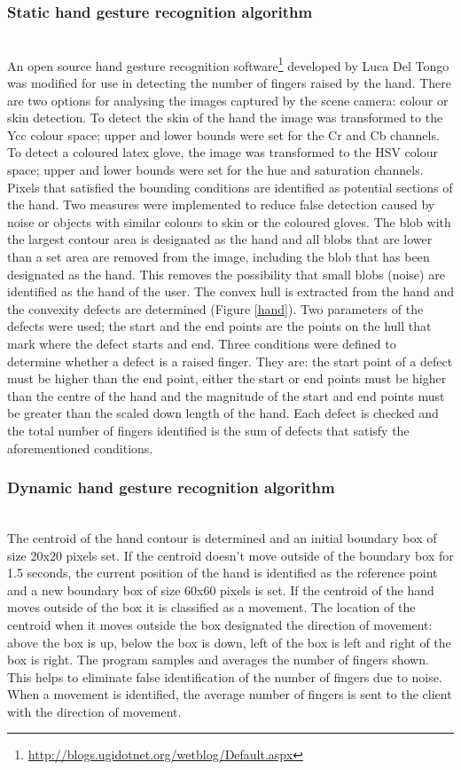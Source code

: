 \documentclass[jou,a4paper,notxfonts]{apa}
\begin{document}
\subsubsection{Static hand gesture recognition algorithm}\hspace{0pt} \\
An open source hand gesture recognition software\footnote{\url{http://blogs.ugidotnet.org/wetblog/Default.aspx}} developed by Luca Del Tongo was modified for use in detecting the number of fingers raised by the hand. There are two options for analysing the images captured by the scene camera: colour or skin detection. To detect the skin of the hand the image was transformed to the Ycc colour space; upper and lower bounds were set for the Cr and Cb channels. To detect a coloured latex glove, the image was transformed to the HSV colour space; upper and lower bounds were set for the hue and saturation channels. Pixels that satisfied the bounding conditions are identified as potential sections of the hand. Two measures were implemented to reduce false detection caused by noise or objects with similar colours to skin or the coloured gloves. The blob with the largest contour area is designated as the hand and all blobs that are lower than a set area are removed from the image, including the blob that has been designated as the hand. This removes the possibility that small blobs (noise) are identified as the hand of the user. The convex hull is extracted from the hand and the convexity defects are determined (Figure \ref{hand}). Two parameters of the defects were used; the start and the end points are the points on the hull that mark where the defect starts and end. Three conditions were defined to determine whether a defect is a raised finger. They are: the start point of a defect must be higher than the end point, either the start or end points must be higher than the centre of the hand and the magnitude of the start and end points must be greater than the scaled down length of the hand. Each defect is checked and the total number of fingers identified is the sum of defects that satisfy the aforementioned conditions. 

\subsubsection{Dynamic hand gesture recognition algorithm}\hspace{0pt} \\
The centroid of the hand contour is determined and an initial boundary box of size 20x20 pixels set. If the centroid doesn't move outside of the boundary box for 1.5 seconds, the current position of the hand is identified as the reference point and a new boundary box of size 60x60 pixels is set. If the centroid of the hand moves outside of the box it is classified as a movement. The location of the centroid when it moves outside the box designated the direction of movement: above the box is up, below the box is down, left of the box is left and right of the box is right. The program samples and averages the number of fingers shown. This helps to eliminate false identification of the number of fingers due to noise. When a movement is identified, the average number of fingers is sent to the client with the direction of movement.
\end{document}
